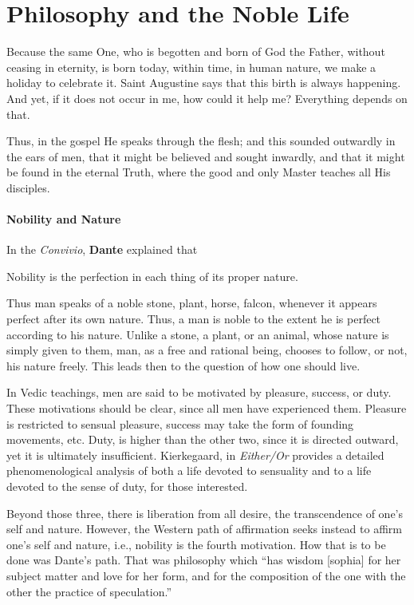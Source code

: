 \section{Philosophy and the Noble Life}

\begin{quotex}
Because the same One, who is begotten and born of God the Father, without ceasing in eternity, is born today, within time, in human nature, we make a holiday to celebrate it. Saint Augustine says that this birth is always happening. And yet, if it does not occur in me, how could it help me? Everything depends on that. 

Thus, in the gospel He speaks through the flesh; and this sounded outwardly in the ears of men, that it might be believed and sought inwardly, and that it might be found in the eternal Truth, where the good and only Master teaches all His disciples. 

\end{quotex}
\paragraph{Nobility and Nature}
In the \textit{Convivio}, \textbf{Dante} explained that

\begin{quotex}
Nobility is the perfection in each thing of its proper nature.

\end{quotex}
Thus man speaks of a noble stone, plant, horse, falcon, whenever it appears perfect after its own nature. Thus, a man is noble to the extent he is perfect according to his nature. Unlike a stone, a plant, or an animal, whose nature is simply given to them, man, as a free and rational being, chooses to follow, or not, his nature freely. This leads then to the question of how one should live.

In Vedic teachings, men are said to be motivated by pleasure, success, or duty. These motivations should be clear, since all men have experienced them. Pleasure is restricted to sensual pleasure, success may take the form of founding movements, etc. Duty, is higher than the other two, since it is directed outward, yet it is ultimately insufficient. Kierkegaard, in \textit{Either/Or} provides a detailed phenomenological analysis of both a life devoted to sensuality and to a life devoted to the sense of duty, for those interested.

Beyond those three, there is liberation from all desire, the transcendence of one's self and nature. However, the Western path of affirmation seeks instead to affirm one's self and nature, i.e., nobility is the fourth motivation. How that is to be done was Dante's path. That was philosophy which “has wisdom [sophia] for her subject matter and love for her form, and for the composition of the one with the other the practice of speculation.”

